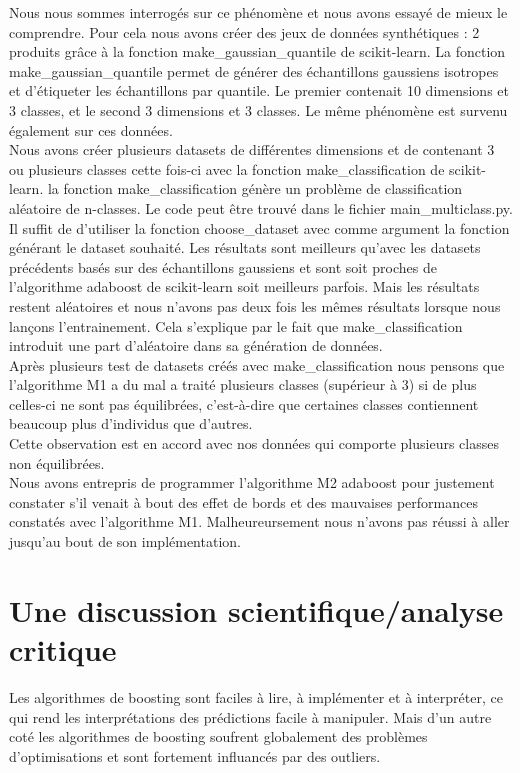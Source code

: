 \documentclass{article}
\begin{document}
Nous nous sommes interrogés sur ce phénomène et nous avons essayé de mieux le comprendre. Pour cela nous avons créer des jeux de données synthétiques : 
2 produits grâce à la fonction make\_gaussian\_quantile de scikit-learn. La fonction make\_gaussian\_quantile permet de 
générer des échantillons gaussiens isotropes et d'étiqueter les échantillons par quantile. Le premier contenait 10 dimensions et 3 classes, et le second 3 dimensions et 3 classes. Le même phénomène est survenu également sur ces données. \\

Nous avons créer plusieurs datasets de différentes dimensions et de contenant 3 ou plusieurs classes cette fois-ci avec la fonction make\_classification de scikit-learn. la fonction make\_classification génère un problème de classification aléatoire de n-classes. Le code peut être trouvé dans le fichier main\_multiclass.py. Il suffit de d'utiliser la fonction choose\_dataset avec comme argument la fonction générant le dataset souhaité. Les résultats sont meilleurs qu'avec les datasets précédents basés sur des échantillons gaussiens et sont soit proches de l'algorithme adaboost de scikit-learn soit meilleurs parfois. Mais les résultats restent aléatoires et nous n'avons pas deux fois les mêmes résultats lorsque nous lançons l'entrainement. Cela s'explique par le fait que make\_classification introduit une part d'aléatoire dans sa génération de données. \\

Après plusieurs test de datasets créés avec make\_classification nous pensons que l'algorithme M1 a du mal a traité plusieurs classes (supérieur à 3) si de plus celles-ci ne sont pas équilibrées, c'est-à-dire que certaines classes contiennent beaucoup plus d'individus que d'autres.\\ 

Cette observation est en accord avec nos données qui comporte plusieurs classes non équilibrées. \\

Nous avons entrepris de programmer l'algorithme M2 adaboost pour justement constater s'il venait à bout des effet de bords  et des mauvaises performances constatés avec l'algorithme M1. 
Malheureursement nous n'avons pas réussi à aller jusqu'au bout de son implémentation. 
\section{Une discussion scientifique/analyse critique}
Les algorithmes de boosting sont faciles à lire, à implémenter et à interpréter, ce qui rend les interprétations des prédictions facile à manipuler\cite{FreundSchapire1996}. Mais d'un autre coté les algorithmes de boosting soufrent globalement des problèmes d'optimisations et sont fortement influancés par des outliers.\\
\end{document}
